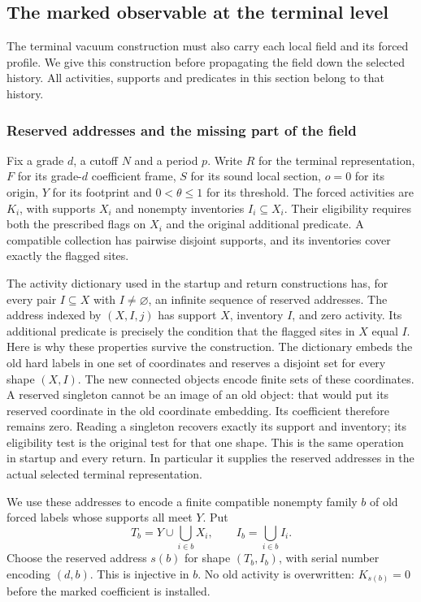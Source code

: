 \subsection{The marked observable at the terminal level}
\label{sec:terminal-marked-construction}
The terminal vacuum construction must also carry each local field and
its forced profile. We give this construction before propagating the
field down the selected history. All activities, supports and predicates
in this section belong to that history.

\subsubsection{Reserved addresses and the missing part of the field}
Fix a grade $d$, a cutoff $N$ and a period $p$. Write $R$ for the
terminal representation, $F$ for its grade-$d$ coefficient frame,
$S$ for its sound local section, $o=0$ for its origin, $Y$ for its
footprint and $0<\theta\le1$ for its threshold. The forced activities are
$K_i$, with supports $X_i$ and nonempty inventories $I_i\subseteq X_i$.
Their eligibility requires both the prescribed flags on $X_i$ and the
original additional predicate. A compatible collection has pairwise
disjoint supports, and its inventories cover exactly the flagged sites.

The activity dictionary used in the startup and return constructions
has, for every pair $I\subseteq X$ with $I\ne\varnothing$, an infinite
sequence of reserved addresses. The address indexed by $(X,I,j)$ has
support $X$, inventory $I$, and zero activity. Its additional predicate
is precisely the condition that the flagged sites in $X$ equal $I$.
Here is why these properties survive the construction. The dictionary
embeds the old hard labels in one set of coordinates and reserves a
disjoint set for every shape $(X,I)$. The new connected objects encode
finite sets of these coordinates. A reserved singleton cannot be an
image of an old object: that would put its reserved coordinate in the
old coordinate embedding. Its coefficient therefore remains zero.
Reading a singleton recovers exactly its support and inventory; its
eligibility test is the original test for that one shape. This is the
same operation in startup and every return. In particular it supplies
the reserved addresses in the actual selected terminal representation.

We use these addresses to encode a finite compatible nonempty family
$b$ of old forced labels whose supports all meet $Y$. Put
\[
 T_b=Y\cup\bigcup_{i\in b}X_i,\qquad
 I_b=\bigcup_{i\in b}I_i.
\]
Choose the reserved address $s(b)$ for shape $(T_b,I_b)$, with serial
number encoding $(d,b)$. This is injective in $b$. No old activity is
overwritten: $K_{s(b)}=0$ before the marked coefficient is installed.

